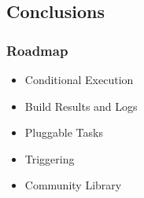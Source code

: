 \documentclass[aspectratio=169,11pt,hyperref={colorlinks=true}]{beamer}
\begin{document}
\begin{lblackrwhiteframe}
\begin{blackframe}

\section{Conclusions}

\begin{grayframe}
  \frametitle{Roadmap}
  \begin{itemize}
    \item Conditional Execution
    \item Build Results and Logs
    \item Pluggable Tasks
    \item Triggering
    \item Community Library
  \end{itemize}
\end{grayframe}


\end{blackframe}
\end{lblackrwhiteframe}
\end{document}
